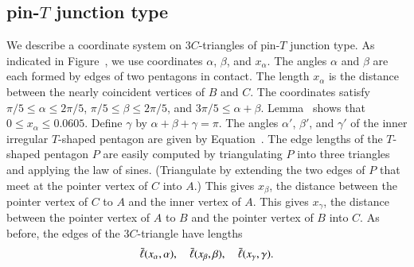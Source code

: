 \subsection{pin-$T$ junction type} We describe a coordinate system on
$3C$-triangles of pin-$T$ junction type.  As indicated in
Figure~, we use coordinates $\alpha$, $\beta$, and
$x_\alpha$.  The angles $\alpha$ and $\beta$ are each formed by edges
of two pentagons in contact.  The length $x_\alpha$ is the distance
between the nearly coincident vertices of $B$ and $C$.
The coordinates satisfy $\pi/5 \le \alpha \le 2\pi/5$, $\pi/5\le
\beta \le 2\pi/5$, and $3\pi/5 \le \alpha+\beta$.
Lemma~ shows that $0\le x_\alpha\le 0.0605$.  Define
$\gamma$ by $\alpha+\beta+\gamma = \pi$.  The angles $\alpha'$,
$\beta'$, and $\gamma'$ of the inner irregular $T$-shaped pentagon are
given by Equation~.  The edge lengths of the $T$-shaped
pentagon $P$ are easily computed by triangulating $P$ into three
triangles and applying the law of sines.  (Triangulate by extending
the two edges of $P$ that meet at the pointer vertex of $C$ into $A$.)
This gives $x_\beta$, the distance between the pointer vertex of $C$
to $A$ and the inner vertex of $A$.  This gives $x_\gamma$, the
distance between the pointer vertex of $A$ to $B$ and the pointer
vertex of $B$ into $C$.  As before, the edges of the $3C$-triangle
have lengths
\[
\bar\ell(x_\alpha,\alpha),\quad \bar\ell(x_\beta,\beta),\quad \bar\ell(x_\gamma,\gamma).
\]




